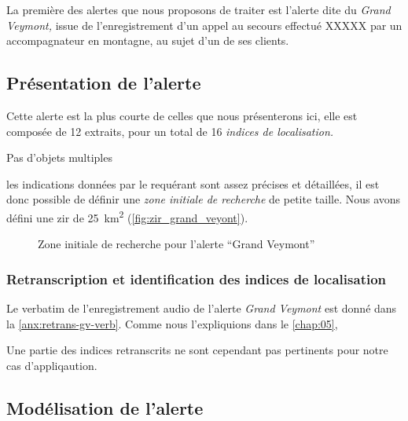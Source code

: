 La première des alertes que nous proposons de traiter est l'alerte
dite du \emph{Grand Veymont,} issue de l'enregistrement d'un appel au
secours effectué XXXXX par un accompagnateur en montagne, au sujet
d'un de ses clients.

\subsection{Présentation de l'alerte}
\label{subsec:9-2-1}

Cette alerte est la plus courte de celles que nous présenterons ici,
elle est composée de 12 extraits, pour un total de 16 \emph{indices de
  localisation.}



Pas d'objets multiples

les indications données par le requérant sont assez précises et
détaillées, il est donc possible de définir une \emph{zone initiale de
  recherche} de petite taille. Nous avons défini une \ac{zir} de
\SI{25}{\kilo\meter\squared} (\autoref{fig:zir_grand_veyont}).

\begin{figure}
  \centering
  
  \caption{Zone initiale de recherche pour l'alerte \enquote{Grand Veymont}}
  \label{fig:zir_grand_veyont}
\end{figure}


\subsubsection{Retranscription et identification des indices de localisation}
\label{subsec:9-2-1-1}


Le verbatim de l'enregistrement audio de l'alerte \emph{Grand Veymont}
est donné dans la \autoref{anx:retrans-gv-verb}.
%
Comme nous l’expliquions dans le \autoref{chap:05}, 


Une partie des indices retranscrits ne sont cependant pas pertinents
pour notre cas d'appliqaution.






\subsection{Modélisation de l'alerte}
\label{subsec:9-2-2}


